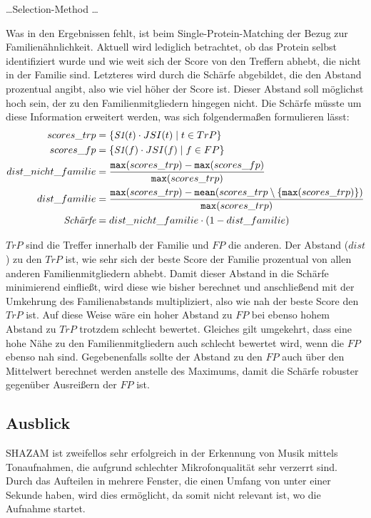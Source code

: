     \dots Selection-Method \dots

    Was in den Ergebnissen fehlt, ist beim Single-Protein-Matching der Bezug zur Familienähnlichkeit. Aktuell wird lediglich betrachtet, ob das Protein selbst identifiziert wurde und wie weit sich der Score von den Treffern abhebt, die nicht in der Familie sind. Letzteres wird durch die Schärfe abgebildet, die den Abstand prozentual angibt, also wie viel höher der Score ist. Dieser Abstand soll möglichst hoch sein, der zu den Familienmitgliedern hingegen nicht. Die Schärfe müsste um diese Information erweitert werden, was sich folgendermaßen formulieren lässt:
    \begin{equation}
        \label{equ:}
        \begin{split}
            scores\_trp &= \{\emph{S1}(t) \cdot JSI(t) \mid t \in TrP\}\\
            scores\_fp &= \{\emph{S1}(f) \cdot JSI(f) \mid f \in FP\}\\
            dist\_nicht\_familie &= \frac{\texttt{max}(scores\_trp) - \texttt{max}(scores\_fp)}{\texttt{max}(scores\_trp)}\\
            dist\_familie &= \frac{\texttt{max}(scores\_trp) - \texttt{mean}(scores\_trp \setminus \{\texttt{max}(scores\_trp)\})}{\texttt{max}(scores\_trp)}\\
            \emph{Schärfe} &= dist\_nicht\_familie \cdot (1 - dist\_familie)
        \end{split}
    \end{equation}

    $TrP$ sind die Treffer innerhalb der Familie und $FP$ die anderen. Der Abstand ($dist$) zu den $TrP$ ist, wie sehr sich der beste Score der Familie prozentual von allen anderen Familienmitgliedern abhebt. Damit dieser Abstand in die Schärfe minimierend einfließt, wird diese wie bisher berechnet und anschließend mit der Umkehrung des Familienabstands multipliziert, also wie nah der beste Score den $TrP$ ist. Auf diese Weise wäre ein hoher Abstand zu $FP$ bei ebenso hohem Abstand zu $TrP$ trotzdem schlecht bewertet. Gleiches gilt umgekehrt, dass eine hohe Nähe zu den Familienmitgliedern auch schlecht bewertet wird, wenn die $FP$ ebenso nah sind. Gegebenenfalls sollte der Abstand zu den $FP$ auch über den Mittelwert berechnet werden anstelle des Maximums, damit die Schärfe robuster gegenüber Ausreißern der $FP$ ist.

    \subsection*{Ausblick} %
        \label{sub:ausblick}
        SHAZAM ist zweifellos sehr erfolgreich in der Erkennung von Musik mittels Tonaufnahmen, die aufgrund schlechter Mikrofonqualität sehr verzerrt sind. Durch das Aufteilen in mehrere Fenster, die einen Umfang von unter einer Sekunde haben, wird dies ermöglicht, da somit nicht relevant ist, wo die Aufnahme startet.

